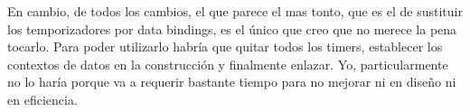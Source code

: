 En cambio, de todos los cambios, el que parece el mas tonto, que es el de 
sustituir los temporizadores por data bindings, es el \'unico que creo que no 
merece la pena tocarlo. Para poder utilizarlo habr\'ia que quitar todos los 
timers, establecer los contextos de datos en la construcci\'on y finalmente 
enlazar. Yo, particularmente no lo har\'ia porque va a requerir bastante tiempo 
para no mejorar ni en dise\~no ni en eficiencia.
